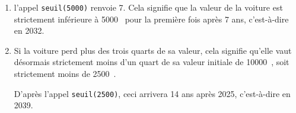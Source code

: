 \documentclass[10pt]{article}
\providecommand{\euro}{\texteuro}
\providecommand{\np}[2][]{{#2~#1}}
\providecommand{\euro}{{\text{€}}}
\renewcommand{\euro}{\ifmmode\text{\texteuro}\else\texteuro\fi}
\begin{document}
\begin{enumerate}
	On obtient ainsi le programme :

\begin{lstlisting}[style=python,numbers=none,xleftmargin=5cm,xrightmargin=5cm]
def seuil(A) :
	N = 0
	U = 10000
	while U >= A :
		U = 0.9*U
		N = N+1
	return N
\end{lstlisting}

	\item l'appel \texttt{seuil(5000)} renvoie 7. Cela signifie que la valeur de la voiture est strictement inférieure à \np[\euro]{5000} pour la première fois après 7 ans, c'est-à-dire en 2032.

	\item Si la voiture perd plus des trois quarts de sa valeur, cela signifie qu'elle vaut désormais strictement moins d'un quart de sa valeur initiale de \np[\euro]{10000}, soit strictement moins de \np[\euro]{2500}.

	D'après l'appel \texttt{seuil(2500)}, ceci arrivera 14 ans après 2025, c'est-à-dire en 2039.
\end{enumerate}

\end{document}
